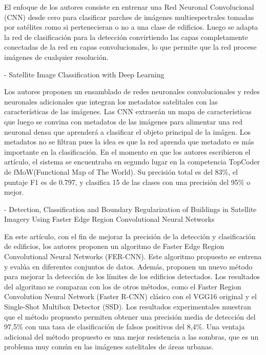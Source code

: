 \documentclass[article]{llncs}
\begin{document}
  El enfoque de los autores consiste en entrenar una Red Neuronal Convolucional (CNN) desde cero para clasificar parches de 
  imágenes multiespectrales tomadas por satélites como si pertenecieran o no a una clase de edificios. Luego se adapta 
  la red de clasificación para la detección convirtiendo las capas completamente conectadas de la red en capas 
  convolucionales, lo que permite que la red procese imágenes de cualquier resolución.

- Satellite Image Classification with Deep Learning

  Los autores proponen un ensamblado de redes neuronales convolucionales y redes neuronales adicionales que integran los 
  metadatos satelitales con las características de las imágenes. Las CNN extraer\'an un mapa de caracter\'isticas que 
  luego se convina con metadatos de las im\'agenes para alimentar una red neuronal densa que aprender\'a a clasificar el 
  objeto principal de la im\'agen. Los metadatos no se filtran pues la idea es que la red aprenda que metadato es m\'as importante 
  en la clasificaci\'on. En el momento en que los autores escribieron el art\'iculo, el sistema se encuentraba en segundo lugar en la competencia 
  TopCoder de fMoW(Functional Map of The World). Su precisión total es del 83\%, el puntaje F1 es de 0.797, y clasifica 15 de las clases con una 
  precisión del 95\% o mejor.

- Detection, Classification and Boundary Regularization of Buildings in Satellite Imagery Using Faster Edge Region 
Convolutional Neural Networks

  En este artículo, con el fin de mejorar la precisión de la detección y clasificación de edificios, los autores proponen un 
  algoritmo de Faster Edge Region Convolutional Neural Networks (FER-CNN). Este algoritmo propuesto se entrena y evalúa 
  en diferentes conjuntos de datos. Además, proponen un nuevo método para mejorar la detección de los límites de los 
  edificios detectados. Los resultados del algoritmo se comparan con los de otros métodos, como el Faster Region 
  Convolution Neural Network (Faster R-CNN) clásico con el VGG16 original y el Single-Shot Multibox Detector (SSD). Los 
  resultados experimentales muestran que el método propuesto permiten obtener una precisión media de detección del 97,5\% con 
  una tasa de clasificación de falsos positivos del 8,4\%. Una ventaja adicional del método propuesto es una mejor resistencia 
  a las sombras, que es un problema muy común en las imágenes satelitales de áreas urbanas.
\end{document}
